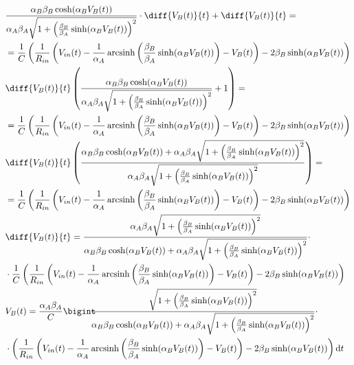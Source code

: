 \documentclass[12pt,a4paper,twoside,english,italian]{book}
\DeclareMathOperator{\arcsinh}{arcsinh}
\newcommand{\Int}[2]{\bigint \hspace{-6px} #1 \mathrm{d}#2}
\begin{document}
		\begin{equation}
			\label{eq:sostituzione}
			\begin{split}
				&\frac{\alpha_{B}\beta_{B}\cosh(\alpha_{B}V_{B}(t))}{\alpha_{A}\beta_{A}\sqrt{1+\left(\frac{\beta_{B}}{\beta_{A}}\sinh(\alpha_{B}V_{B}(t))\right)^{2}}}\cdot\diff{V_{B}(t)}{t}+\diff{V_{B}(t)}{t} =\\&= \frac{1}{C}\left(\frac{1}{R_{in}}\left(V_{in}(t)-\frac{1}{\alpha_{A}} \arcsinh \left(\frac{\beta_{B}}{\beta_{A}} \sinh(\alpha_{B}V_{B}(t))\right)-V_{B}(t)\right)-2\beta_{B}\sinh(\alpha_{B}V_{B}(t))\right)\\
				&\diff{V_{B}(t)}{t}\left(\frac{\alpha_{B}\beta_{B}\cosh(\alpha_{B}V_{B}(t))}{\alpha_{A}\beta_{A}\sqrt{1+\left(\frac{\beta_{B}}{\beta_{A}}\sinh(\alpha_{B}V_{B}(t))\right)^{2}}}+1\right) =\\&= \frac{1}{C}\left(\frac{1}{R_{in}}\left(V_{in}(t)-\frac{1}{\alpha_{A}} \arcsinh \left(\frac{\beta_{B}}{\beta_{A}} \sinh(\alpha_{B}V_{B}(t))\right)-V_{B}(t)\right)-2\beta_{B}\sinh(\alpha_{B}V_{B}(t))\right)\\
				&\diff{V_{B}(t)}{t}\left(\frac{\alpha_{B}\beta_{B}\cosh(\alpha_{B}V_{B}(t))+\alpha_{A}\beta_{A}\sqrt{1+\left(\frac{\beta_{B}}{\beta_{A}}\sinh(\alpha_{B}V_{B}(t))\right)^{2}}}{\alpha_{A}\beta_{A}\sqrt{1+\left(\frac{\beta_{B}}{\beta_{A}}\sinh(\alpha_{B}V_{B}(t))\right)^{2}}}\right) =\\&= \frac{1}{C}\left(\frac{1}{R_{in}}\left(V_{in}(t)-\frac{1}{\alpha_{A}} \arcsinh \left(\frac{\beta_{B}}{\beta_{A}} \sinh(\alpha_{B}V_{B}(t))\right)-V_{B}(t)\right)-2\beta_{B}\sinh(\alpha_{B}V_{B}(t))\right)\\
				&\diff{V_{B}(t)}{t} = \frac{\alpha_{A}\beta_{A}\sqrt{1+\left(\frac{\beta_{B}}{\beta_{A}}\sinh(\alpha_{B}V_{B}(t))\right)^{2}}}{\alpha_{B}\beta_{B}\cosh(\alpha_{B}V_{B}(t))+\alpha_{A}\beta_{A}\sqrt{1+\left(\frac{\beta_{B}}{\beta_{A}}\sinh(\alpha_{B}V_{B}(t))\right)^{2}}}\cdot\\&\cdot\frac{1}{C}\left(\frac{1}{R_{in}}\left(V_{in}(t)-\frac{1}{\alpha_{A}} \arcsinh \left(\frac{\beta_{B}}{\beta_{A}} \sinh(\alpha_{B}V_{B}(t))\right)-V_{B}(t)\right)-2\beta_{B}\sinh(\alpha_{B}V_{B}(t))\right)\\
				&V_{B}(t) = \frac{\alpha_{A}\beta_{A}}{C}\Int{\frac{\sqrt{1+\left(\frac{\beta_{B}}{\beta_{A}}\sinh(\alpha_{B}V_{B}(t))\right)^{2}}}{\alpha_{B}\beta_{B}\cosh(\alpha_{B}V_{B}(t))+\alpha_{A}\beta_{A}\sqrt{1+\left(\frac{\beta_{B}}{\beta_{A}}\sinh(\alpha_{B}V_{B}(t))\right)^{2}}}\cdot\\&\cdot\left(\frac{1}{R_{in}}\left(V_{in}(t)-\frac{1}{\alpha_{A}} \arcsinh \left(\frac{\beta_{B}}{\beta_{A}} \sinh(\alpha_{B}V_{B}(t))\right)-V_{B}(t)\right)-2\beta_{B}\sinh(\alpha_{B}V_{B}(t))\right)}{t}\\
			\end{split}
		\end{equation}
		
\end{document}
